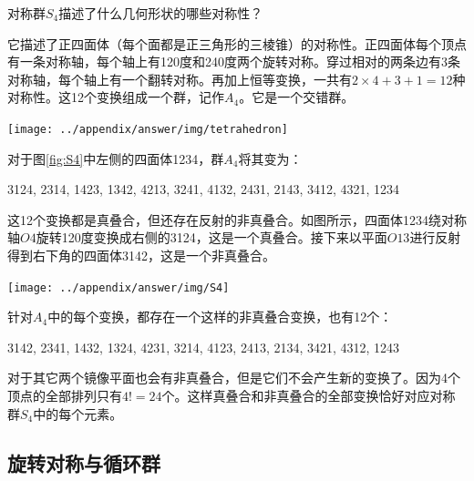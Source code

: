 \documentclass[b5paper]{ctexart}
\begin{document}
\begin{Answer}[ref={ex:symmetry-and-group}]
对称群$S_4$描述了什么几何形状的哪些对称性？

它描述了正四面体（每个面都是正三角形的三棱锥）的对称性。正四面体每个顶点有一条对称轴，每个轴上有120度和240度两个旋转对称。穿过相对的两条边有3条对称轴，每个轴上有一个翻转对称。再加上恒等变换，一共有$2 \times 4 + 3 + 1 = 12$种对称性。这12个变换组成一个群，记作$A_4$。它是一个交错群。

\begin{center}
 \texttt{[image: ../appendix/answer/img/tetrahedron]}
 \label{fig:tetrahedron}
\end{center}

对于图\ref{fig:S4}中左侧的四面体1234，群$A_4$将其变为：

3124, 2314, 1423, 1342, 4213, 3241, 4132, 2431, 2143, 3412, 4321, 1234

这12个变换都是真叠合，但还存在反射的非真叠合。如图所示，四面体1234绕对称轴$O4$旋转120度变换成右侧的3124，这是一个真叠合。接下来以平面$O13$进行反射得到右下角的四面体3142，这是一个非真叠合。

\begin{center}
 \texttt{[image: ../appendix/answer/img/S4]}
 \label{fig:S4}
\end{center}

针对$A_4$中的每个变换，都存在一个这样的非真叠合变换，也有12个：

3142, 2341, 1432, 1324, 4231, 3214, 4123, 2413, 2134, 3421, 4312, 1243

对于其它两个镜像平面也会有非真叠合，但是它们不会产生新的变换了。因为4个顶点的全部排列只有$4! = 24$个。这样真叠合和非真叠合的全部变换恰好对应对称群$S_4$中的每个元素。
\end{Answer}

\subsection{旋转对称与循环群}
\end{document}
